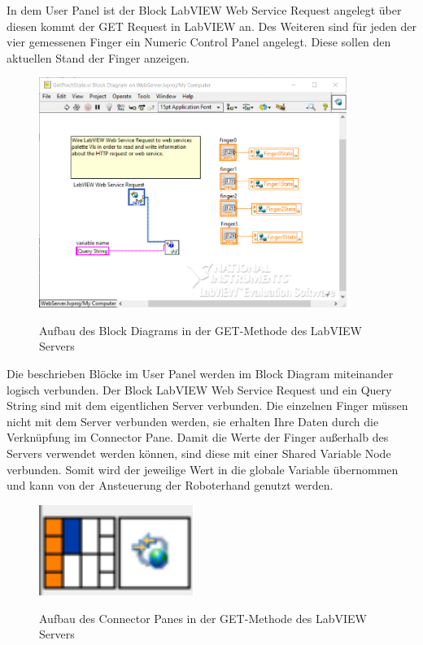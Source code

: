 \documentclass[a4paper,12pt,final]{article} %
\numberwithin{equation}{section} %
\numberwithin{figure}{section} %
\numberwithin{table}{section} %
\begin{document}
In dem User Panel ist der Block LabVIEW Web Service Request angelegt über diesen kommt der GET Request in LabVIEW an.
Des Weiteren sind für jeden der vier gemessenen Finger ein Numeric Control Panel angelegt. Diese sollen den aktuellen Stand der Finger anzeigen.
\begin{figure}[H]
	\begin{center}
		\includegraphics[width=10cm]{Bilder/BlockDiagram.png}
		\label{fig:LabVIEWBlockDia}
		\caption{Aufbau des Block Diagrams in der GET-Methode des LabVIEW Servers}
	\end{center}
\end{figure}
Die beschrieben Blöcke im User Panel werden im Block Diagram miteinander logisch verbunden.
Der Block LabVIEW Web Service Request und ein Query String sind mit dem eigentlichen Server verbunden. Die einzelnen Finger müssen nicht mit dem Server verbunden werden, sie erhalten Ihre Daten durch die Verknüpfung im Connector Pane.
Damit die Werte der Finger außerhalb des Servers verwendet werden können, sind diese mit einer Shared Variable Node verbunden. Somit wird der jeweilige Wert in die globale Variable übernommen und kann von der Ansteuerung der Roboterhand genutzt werden.  
\begin{figure}[H]
	\begin{center}
		\includegraphics[width=5cm]{Bilder/ConnectorPane.png}
		\label{fig:LabVIEWConnectorPane}
		\caption{Aufbau des Connector Panes in der GET-Methode des LabVIEW Servers}
	\end{center}
\end{figure}  
\end{document}
